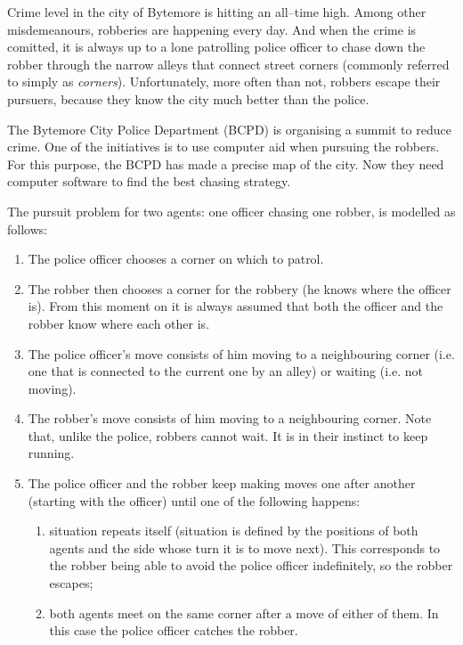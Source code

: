 \documentclass{boi2014}
\begin{document}
    Crime level in the city of Bytemore is hitting an all--time high.
    Among other misdemeanours, robberies are happening every day.
    And when the crime is comitted, it is always up to a lone patrolling
    police officer to chase down the robber through the narrow alleys
    that connect street corners (commonly referred to simply as
    \emph{corners}). Unfortunately, more often than not, robbers escape
    their pursuers, because they know the city much better than
    the police.

    The Bytemore City Police Department (BCPD) is organising a summit
    to reduce crime. One of the initiatives is to use computer aid when
    pursuing the robbers. For this purpose, the BCPD has made a precise
    map of the city. Now they need computer software to find the best
    chasing strategy.

    The pursuit problem for two agents: one officer chasing one robber,
    is modelled as follows:
    \begin{enumerate}
        \item The police officer chooses a corner on which to patrol.
        \item The robber then chooses a corner for the robbery
            (he knows where the officer is). From this moment on it
            is always assumed that both the officer and the robber
            know where each other is.
        \item The police officer's move consists of him moving to a
            neighbouring corner (i.e. one that is connected to the
            current one by an alley) or waiting (i.e. not moving).
        \item The robber's move consists of him moving to a neighbouring
            corner. Note that, unlike the police, robbers cannot wait.
            It is in their instinct to keep running.
        \item The police officer and the robber keep making moves one after
        another (starting with the officer) until one of the following
        happens:
        \begin{enumerate}
            \item situation repeats itself (situation is defined
                by the positions of both agents and the side whose turn
                it is to move next). This corresponds to the robber being
                able to avoid the police officer indefinitely, so the
                robber escapes;
            \item both agents meet on the same corner after a move of
                either of them. In this case the police officer catches
                the robber.
        \end{enumerate}
    \end{enumerate}
\end{document}
